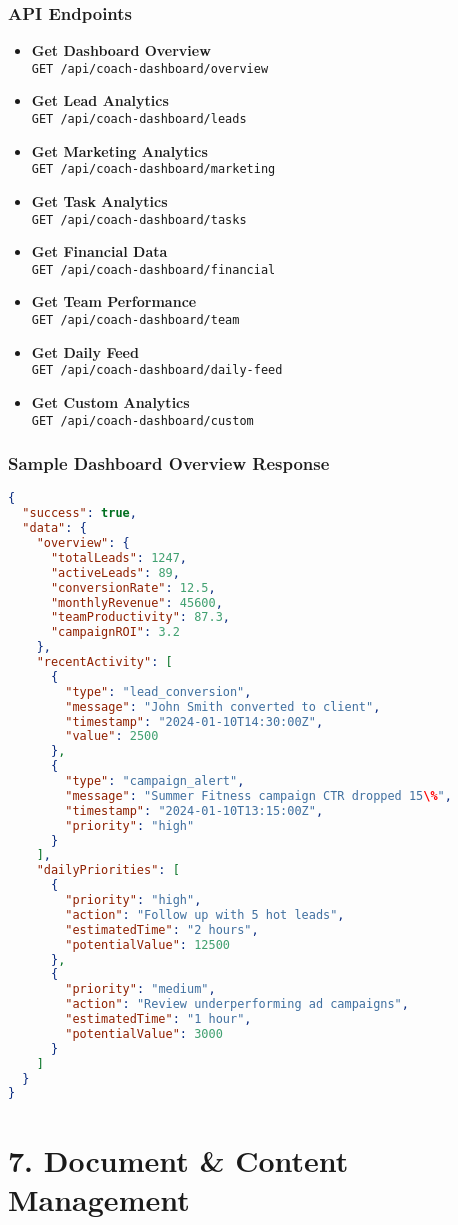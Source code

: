 \documentclass[12pt,a4paper]{article}
\newcommand{\apiendpoint}[2]{\textbf{#1} \\ \texttt{#2}}
\newcommand{\samplecode}[1]{\begin{lstlisting}[language=JSON]#1\end{lstlisting}}
\begin{document}
\subsubsection{API Endpoints}
\begin{itemize}
    \item \apiendpoint{Get Dashboard Overview}{GET /api/coach-dashboard/overview}
    \item \apiendpoint{Get Lead Analytics}{GET /api/coach-dashboard/leads}
    \item \apiendpoint{Get Marketing Analytics}{GET /api/coach-dashboard/marketing}
    \item \apiendpoint{Get Task Analytics}{GET /api/coach-dashboard/tasks}
    \item \apiendpoint{Get Financial Data}{GET /api/coach-dashboard/financial}
    \item \apiendpoint{Get Team Performance}{GET /api/coach-dashboard/team}
    \item \apiendpoint{Get Daily Feed}{GET /api/coach-dashboard/daily-feed}
    \item \apiendpoint{Get Custom Analytics}{GET /api/coach-dashboard/custom}
\end{itemize}

\subsubsection{Sample Dashboard Overview Response}
\samplecode{
{
  "success": true,
  "data": {
    "overview": {
      "totalLeads": 1247,
      "activeLeads": 89,
      "conversionRate": 12.5,
      "monthlyRevenue": 45600,
      "teamProductivity": 87.3,
      "campaignROI": 3.2
    },
    "recentActivity": [
      {
        "type": "lead_conversion",
        "message": "John Smith converted to client",
        "timestamp": "2024-01-10T14:30:00Z",
        "value": 2500
      },
      {
        "type": "campaign_alert",
        "message": "Summer Fitness campaign CTR dropped 15\%",
        "timestamp": "2024-01-10T13:15:00Z",
        "priority": "high"
      }
    ],
    "dailyPriorities": [
      {
        "priority": "high",
        "action": "Follow up with 5 hot leads",
        "estimatedTime": "2 hours",
        "potentialValue": 12500
      },
      {
        "priority": "medium",
        "action": "Review underperforming ad campaigns",
        "estimatedTime": "1 hour",
        "potentialValue": 3000
      }
    ]
  }
}
}

\section{7. Document \& Content Management}
\end{document}
